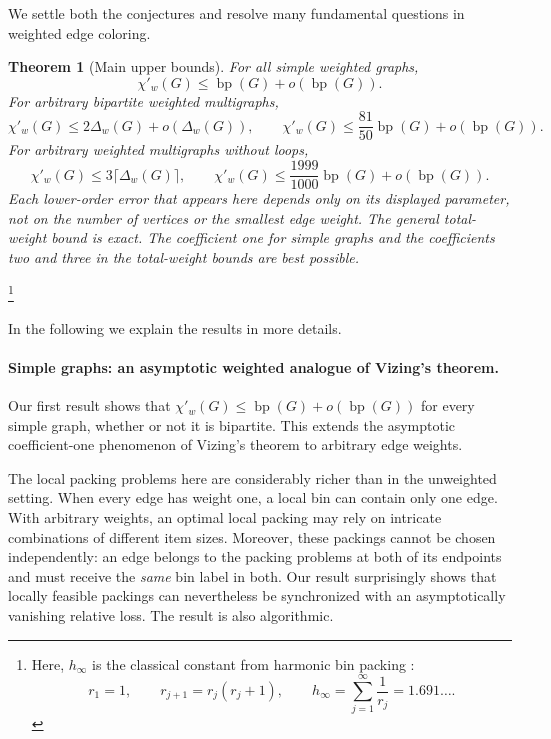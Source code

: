 \documentclass[11pt]{article}
\newtheorem{theorem}{Theorem}[section]
\theoremstyle{definition}\newtheorem{algorithm}{Algorithm}[section]
\numberwithin{equation}{section}
\theoremstyle{remark}\newtheorem*{remark}{Remark}
\newcommand{\bp}{\operatorname{bp}}
\newcommand{\eps}{\varepsilon}
\newcommand{\cw}{\chi'_w}
\begin{document}
We settle both the conjectures and resolve many fundamental questions in weighted edge coloring. 
\begin{theorem}[Main upper bounds]\label{thm:main}
For all simple weighted graphs,
\[
 \chi'_w(G)\le\bp(G)+o(\bp(G)).
\]
For arbitrary bipartite weighted multigraphs,
\[
 \chi'_w(G)\le2\Delta_w(G)+o(\Delta_w(G)),
\qquad
 \chi'_w(G)\le \frac{81}{50}\bp(G)+o(\bp(G)).
\]
For arbitrary weighted multigraphs without loops,
\[
 \chi'_w(G)\le3\lceil\Delta_w(G)\rceil,
 \qquad
 \chi'_w(G)\le\frac{1999}{1000}\bp(G)+o(\bp(G)).
\]
Each lower-order error that appears here depends only on its displayed
parameter, not on the number of vertices or the smallest edge weight.
The general total-weight bound is exact. The coefficient one for
simple graphs and the coefficients two and three in the total-weight
bounds are best possible.
\end{theorem}
\footnote{
Here,  $h_\infty$ is the classical constant from harmonic bin packing \cite{Epstein}:
\begin{equation}\label{eq:harmonic-constant}
 r_1=1,\qquad r_{j+1}=r_j(r_j+1),\qquad
 h_\infty=\sum_{j=1}^{\infty}\frac1{r_j}
 =1.691 \ldots.
\end{equation}}

In the following we explain the results in more details. 


\paragraph{Simple graphs: an asymptotic weighted analogue of Vizing's theorem.}
Our first result shows that
$\cw(G)\le\bp(G)+o(\bp(G))$ for every simple graph, whether or not
it is bipartite. This extends the asymptotic coefficient-one phenomenon
of Vizing's theorem to arbitrary edge weights.


The local packing problems here are considerably richer than in the
unweighted setting. When every edge has weight one, a local bin can
contain only one edge. With arbitrary weights, an optimal local packing
may rely on intricate combinations of different item sizes. Moreover,
these packings cannot be chosen independently: an edge belongs to the
packing problems at both of its endpoints and must receive the
\emph{same} bin label in both. Our result surprisingly shows that locally feasible
packings can nevertheless be synchronized with an asymptotically
vanishing relative loss. The result is also algorithmic.
\end{document}
